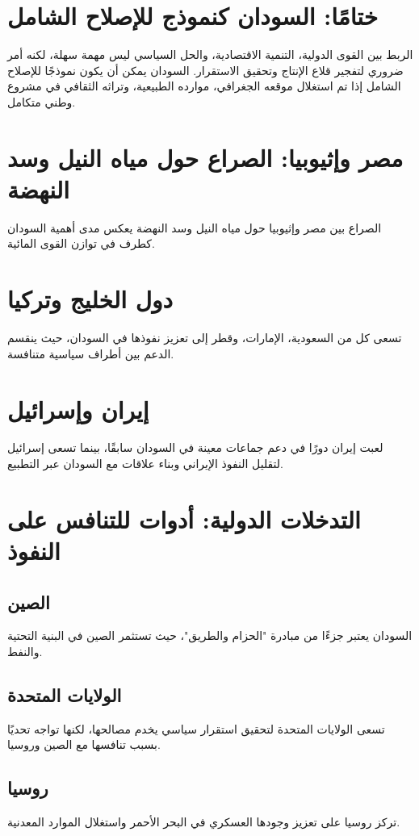\documentclass[12pt]{article}
\begin{document}
\section*{ختامًا: السودان كنموذج للإصلاح الشامل}
الربط بين القوى الدولية، التنمية الاقتصادية، والحل السياسي ليس مهمة سهلة، لكنه أمر ضروري لتفجير قلاع الإنتاج وتحقيق الاستقرار. السودان يمكن أن يكون نموذجًا للإصلاح الشامل إذا تم استغلال موقعه الجغرافي، موارده الطبيعية، وتراثه الثقافي في مشروع وطني متكامل.



\section{مصر وإثيوبيا: الصراع حول مياه النيل وسد النهضة}
الصراع بين مصر وإثيوبيا حول مياه النيل وسد النهضة يعكس مدى أهمية السودان كطرف في توازن القوى المائية.

\section{دول الخليج وتركيا}
تسعى كل من السعودية، الإمارات، وقطر إلى تعزيز نفوذها في السودان، حيث ينقسم الدعم بين أطراف سياسية متنافسة.

\section{إيران وإسرائيل}
لعبت إيران دورًا في دعم جماعات معينة في السودان سابقًا، بينما تسعى إسرائيل لتقليل النفوذ الإيراني وبناء علاقات مع السودان عبر التطبيع.

\section{التدخلات الدولية: أدوات للتنافس على النفوذ}
\subsection{الصين}
السودان يعتبر جزءًا من مبادرة "الحزام والطريق"، حيث تستثمر الصين في البنية التحتية والنفط.

\subsection{الولايات المتحدة}
تسعى الولايات المتحدة لتحقيق استقرار سياسي يخدم مصالحها، لكنها تواجه تحديًا بسبب تنافسها مع الصين وروسيا.

\subsection{روسيا}
تركز روسيا على تعزيز وجودها العسكري في البحر الأحمر واستغلال الموارد المعدنية.
\end{document}
